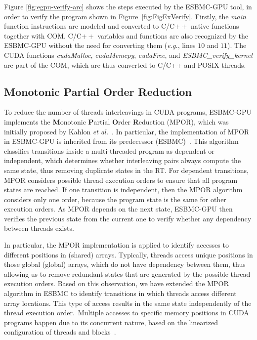 \documentclass[times, doublespace]{cpeauth}
\begin{document}
Figure \ref{fig:egpu-verify-arc} shows the steps executed by the ESBMC-GPU tool, in order to verify the program shown in Figure~\ref{fig:FigExVerify}. Firstly, the \textit{main} function instructions are modeled and converted to C/C$++$ native functions together with COM. C/C$++$ variables and functions are also recognized by the ESBMC-GPU without the need for converting them ({\it e.g.}, lines $10$ and $11$). The CUDA functions \textit{cudaMalloc}, \textit{cudaMemcpy}, \textit{cudaFree}, and \textit{ESBMC\_verify\_kernel}  are part of the COM, which are thus converted to C/C++ and POSIX threads.


\subsection{Monotonic Partial Order Reduction}
\label{sec:mpor}

To reduce the number of threads interleavings in CUDA programs, ESBMC-GPU implements the \textbf{M}onotonic \textbf{P}artial \textbf{O}rder \textbf{R}eduction (MPOR), which was initially proposed by Kahlon {\it et al.}~\cite{KahlonWG09}. In particular, the implementation of MPOR in ESBMC-GPU is inherited from its predecessor (ESBMC)~\cite{morse:2015}. This algorithm classifies transitions inside a multi-threaded program as dependent or independent, which determines whether interleaving pairs always compute the same state, thus removing duplicate states in the RT. For dependent transitions, MPOR considers possible thread execution orders to ensure that all program states are reached. If one transition is independent, then the MPOR algorithm considers only one order, because the program state is the same for other execution orders. As MPOR depends on the next state, ESBMC-GPU then verifies the previous state from the current one to verify whether any dependency between threads exists.

In particular, the MPOR implementation is applied to identify accesses to different positions in (shared) arrays. Typically, threads access unique positions in those global (global) arrays, which do not have dependency between them, thus allowing us to remove redundant states that are generated by the possible thread execution orders. Based on this observation, we have extended the MPOR algorithm in ESBMC to identify transitions in which threads access different array locations. This type of access results in the same state independently of the thread execution order.\ Multiple accesses to specific memory positions in CUDA programs happen due to its concurrent nature, based on the linearized configuration of threads and blocks~\cite{cuda:2012}.\ 
\end{document}
